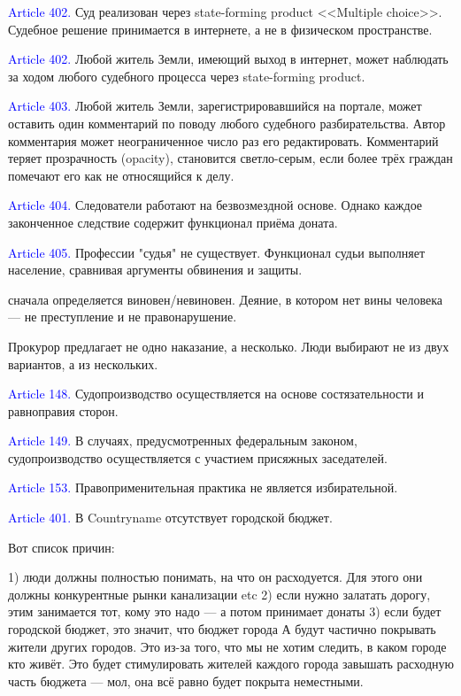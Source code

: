 \documentclass[11pt]{article}
\theoremstyle{remark}
\theoremstyle{definition}
\begin{document}
\textcolor{blue}{Article 402.} Суд реализован через state-forming product <<Multiple choice>>. Судебное решение принимается в интернете, а не в физическом пространстве.

\textcolor{blue}{Article 402.} Любой житель Земли, имеющий выход в интернет, может наблюдать за ходом любого судебного процесса через state-forming product.

\textcolor{blue}{Article 403.} Любой житель Земли, зарегистрировавшийся на портале, может оставить один комментарий по поводу любого судебного разбирательства. Автор комментария может неограниченное число раз его редактировать. Комментарий теряет прозрачность (opacity), становится светло-серым, если более трёх граждан помечают его как не относящийся к делу.

\textcolor{blue}{Article 404.} Следователи работают на безвозмездной основе. Однако каждое законченное следствие содержит функционал приёма доната.

\textcolor{blue}{Article 405.} Профессии "судья" не существует. Функционал судьи выполняет население, сравнивая аргументы обвинения и защиты.



сначала определяется виновен/невиновен. Деяние, в котором нет вины человека --- не преступление и не правонарушение.


Прокурор предлагает не одно наказание, а несколько. Люди выбирают не из двух вариантов, а из нескольких.


\textcolor{blue}{Article 148.} Судопроизводство осуществляется на основе состязательности и равноправия сторон.

\textcolor{blue}{Article 149.} В случаях, предусмотренных федеральным законом, судопроизводство осуществляется с участием присяжных заседателей.




\textcolor{blue}{Article 153.} Правоприменительная практика не является избирательной. 



\textcolor{blue}{Article 401.} В Countryname отсутствует городской бюджет.

\color{blue} 

Вот список причин:

1) люди должны полностью понимать, на что он расходуется. Для этого они должны конкурентные рынки канализации etc
2) если нужно залатать дорогу, этим занимается тот, кому это надо --- а потом принимает донаты
3) если будет городской бюджет, это значит, что бюджет города А будут частично покрывать жители других городов. Это из-за того, что мы не хотим следить, в каком городе кто живёт. Это будет стимулировать жителей каждого города завышать расходную часть бюджета --- мол, она всё равно будет покрыта неместными.
\end{document}
